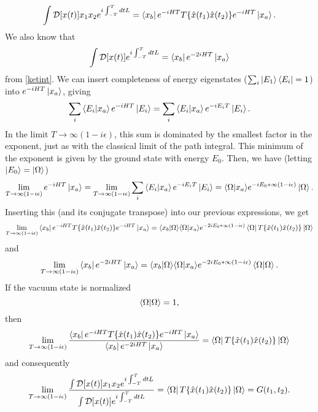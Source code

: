 \begin{equation}
    \int \mathcal D [x(t)] x_1 x_2 e^{i\int_{-T}^T dtL}=\bra{x_b} e^{-iHT} T\{\hat x(t_1) \hat x(t_2)\}e^{-iHT}\ket{x_a}.
\end{equation}
We also know that
\begin{equation}
    \int \mathcal D [x(t)] e^{i\int_{-T}^T dtL}=\bra{x_b} e^{-2iHT} \ket{x_a}
\end{equation}
from \eqref{ketint}. We can insert completeness of energy eigenstates ($\sum_i \ket{E_1}\bra{E_i}=1$) into $e^{-iHT}\ket{x_a}$, giving
\begin{equation}
    \sum_i \bra{E_i}\ket{x_a} e^{-iHT}\ket{E_i}=\sum_i \bra{E_i}\ket{x_a} e^{-iE_iT}\ket{E_i}.
\end{equation}
In the limit $T\to \infty(1-i\epsilon)$, this sum is dominated by the smallest factor in the exponent, just as with the classical limit of the path integral. This minimum of the exponent is given by the ground state with energy $E_0$. Then, we have (letting $\ket{E_0}=\ket{\Omega}$)
\begin{equation}
    \lim_{T\to \infty(1-i\epsilon)}e^{-iHT}\ket{x_a}= \lim_{T\to \infty(1-i\epsilon)}\sum_i \bra{E_i}\ket{x_a} e^{-iE_iT}\ket{E_i}=\langle \Omega| x_a \rangle e^{-iE_0*\infty (1-i\epsilon)}\ket \Omega.
\end{equation}
Inserting this (and its conjugate transpose) into our previous expressions, we get 
\begin{equation}
     \lim_{T\to \infty(1-i\epsilon)}\bra{x_b} e^{-iHT} T\{\hat x(t_1) \hat x(t_2)\}e^{-iHT}\ket{x_a}=\langle x_b|\Omega \rangle \langle \Omega|x_a\rangle e^{-2iE_0*\infty(1-i\epsilon)}\bra{\Omega}T\{\hat x(t_1) \hat x(t_2)\}\ket{\Omega}
\end{equation}
and
\begin{equation}
    \lim_{T\to \infty(1-i\epsilon)}\bra{x_b} e^{-2iHT} \ket{x_a}=\langle x_b|\Omega \rangle \langle \Omega|x_a\rangle e^{-2iE_0*\infty(1-i\epsilon)}\bra{\Omega}\ket{\Omega}.
\end{equation}
If the vacuum state is normalized
\begin{equation}
    \bra{\Omega}\ket{\Omega}=1,
\end{equation}
then 
\begin{equation}
    \lim_{T\to \infty(1-i\epsilon)} \frac{\bra{x_b} e^{-iHT} T\{\hat x(t_1) \hat x(t_2)\}e^{-iHT}\ket{x_a}}{\bra{x_b} e^{-2iHT} \ket{x_a}}=\bra{\Omega}T\{\hat x(t_1) \hat x(t_2)\}\ket{\Omega}
\end{equation}
and consequently
\begin{equation}
    \lim_{T\to \infty(1-i\epsilon)} \frac{\int \mathcal D [x(t)] x_1 x_2 e^{i\int_{-T}^T dtL}}{\int \mathcal D [x(t)] e^{i\int_{-T}^T dtL}}=\bra{\Omega}T\{\hat x(t_1) \hat x(t_2)\}\ket{\Omega}=G(t_1,t_2).
\end{equation}

